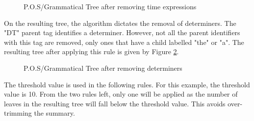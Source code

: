 \begin{figure}[H]
\caption{P.O.S/Grammatical Tree after removing time expressions}
\label{tree:removeTime}
\end{figure}
\par On the resulting tree, the algorithm dictates the removal of determiners. The "DT" parent tag identifies a determiner. However, not all the parent identifiers with this tag are removed, only ones that have a child labelled "the" or "a". The resulting tree after applying this rule is given by Figure \ref{tree:removeDeterminers}.
\begin{figure}[H]
\caption{P.O.S/Grammatical Tree after removing determiners}
\label{tree:removeDeterminers}
\end{figure}
\par The threshold value is used in the following rules. For this example, the threshold value is 10. From the two rules left, only one will be applied as the number of leaves in the resulting tree will fall below the threshold value. This avoids over-trimming the summary.
